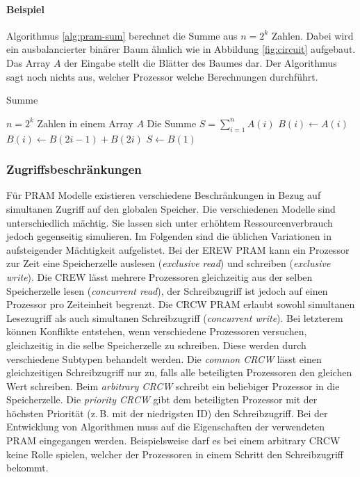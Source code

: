 \paragraph{Beispiel}
Algorithmus \ref{alg:pram-sum} berechnet die Summe aus $n = 2^k$ Zahlen.
Dabei wird ein ausbalancierter binärer Baum ähnlich wie in
Abbildung \ref{fig:circuit} aufgebaut.
Das Array $A$ der Eingabe stellt die Blätter des Baumes dar.
Der Algorithmus sagt noch nichts aus, welcher Prozessor welche Berechnungen
durchführt.

\begin{algorithm}
    \caption{Summe \cite[S.26]{jaja}}
    \label{alg:pram-sum}
    \begin{algorithmic}[1]
    \Require $n = 2^k$ Zahlen in einem Array $A$
    \Ensure Die Summe $S = \sum_{i=1}^n A(i)$
        \State $B(i) \gets A(i)$
    \EndParDo
            \State $B(i) \gets B(2i-1) + B(2i)$
        \EndParDo
    \EndFor
    \State $S \gets B(1)$
    \end{algorithmic}
\end{algorithm}

\subsubsection{Zugriffsbeschränkungen}
Für PRAM Modelle existieren verschiedene Beschränkungen in Bezug auf simultanen
Zugriff auf den globalen Speicher.
Die verschiedenen Modelle sind unterschiedlich mächtig. Sie lassen sich unter
erhöhtem Ressourcenverbrauch jedoch gegenseitig simulieren.
Im Folgenden sind die üblichen Variationen in aufsteigender Mächtigkeit
aufgelistet.
Bei der EREW PRAM kann ein Prozessor zur Zeit eine Speicherzelle auslesen
(\emph{exclusive read}) und schreiben (\emph{exclusive write}).
Die CREW lässt mehrere Prozessoren gleichzeitig aus der selben Speicherzelle
lesen (\emph{concurrent read}), der Schreibzugriff ist jedoch auf einen
Prozessor pro Zeiteinheit begrenzt.
Die CRCW PRAM erlaubt sowohl simultanen Lesezugriff als auch simultanen
Schreibzugriff (\emph{concurrent write}).
Bei letzterem können Konflikte entstehen, wenn verschiedene Prozessoren
versuchen, gleichzeitig in die selbe Speicherzelle zu schreiben.
Diese werden durch verschiedene Subtypen behandelt werden.
Die \emph{common CRCW} lässt einen gleichzeitigen Schreibzugriff nur zu, falls
alle beteiligten Prozessoren den gleichen Wert schreiben.
Beim \emph{arbitrary CRCW} schreibt ein beliebiger Prozessor in die
Speicherzelle.
Die \emph{priority CRCW} gibt dem beteiligten Prozessor mit der höchsten
Priorität (z.\,B. mit der niedrigsten ID) den Schreibzugriff.
Bei der Entwicklung von Algorithmen muss auf die Eigenschaften der verwendeten
PRAM eingegangen werden.
Beispielsweise darf es bei einem arbitrary CRCW keine Rolle spielen, welcher der
Prozessoren in einem Schritt den Schreibzugriff bekommt.
\cite[S.14f.]{jaja}
